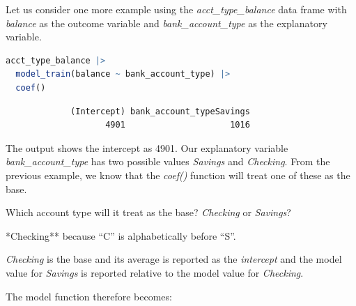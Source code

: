 \documentclass[
  12pt,
  letterpaper,
  DIV=11,
  numbers=noendperiod]{scrreprt}
\begin{document}
Let us consider one more example using the \emph{acct\_type\_balance}
data frame with \emph{balance} as the outcome variable and
\emph{bank\_account\_type} as the explanatory variable.

\begin{lstlisting}[language=R]
acct_type_balance |> 
  model_train(balance ~ bank_account_type) |> 
  coef()
\end{lstlisting}

\begin{lstlisting}
             (Intercept) bank_account_typeSavings 
                    4901                     1016 
\end{lstlisting}

The output shows the intercept as 4901. Our explanatory variable
\emph{bank\_account\_type} has two possible values \emph{Savings} and
\emph{Checking}. From the previous example, we know that the
\emph{coef()} function will treat one of these as the base.

\begin{tcolorbox}[enhanced jigsaw, colback=white, leftrule=.75mm, toprule=.15mm, bottomtitle=1mm, breakable, coltitle=black, toptitle=1mm, title={Quick Check}, opacitybacktitle=0.6, colbacktitle=quarto-callout-note-color!10!white, arc=.35mm, left=2mm, colframe=quarto-callout-note-color-frame, titlerule=0mm, rightrule=.15mm, bottomrule=.15mm, opacityback=0]

Which account type will it treat as the base? \emph{Checking} or
\emph{Savings}?

\end{tcolorbox}

\begin{tcolorbox}[enhanced jigsaw, colback=white, leftrule=.75mm, toprule=.15mm, bottomtitle=1mm, breakable, coltitle=black, toptitle=1mm, title={Suggested answer}, opacitybacktitle=0.6, colbacktitle=quarto-callout-note-color!10!white, arc=.35mm, left=2mm, colframe=quarto-callout-note-color-frame, titlerule=0mm, rightrule=.15mm, bottomrule=.15mm, opacityback=0]

*Checking** because ``C'' is alphabetically before ``S''.

\end{tcolorbox}

\emph{Checking} is the base and its average is reported as the
\emph{intercept} and the model value for \emph{Savings} is reported
relative to the model value for \emph{Checking}.

The model function therefore becomes:
\end{document}
